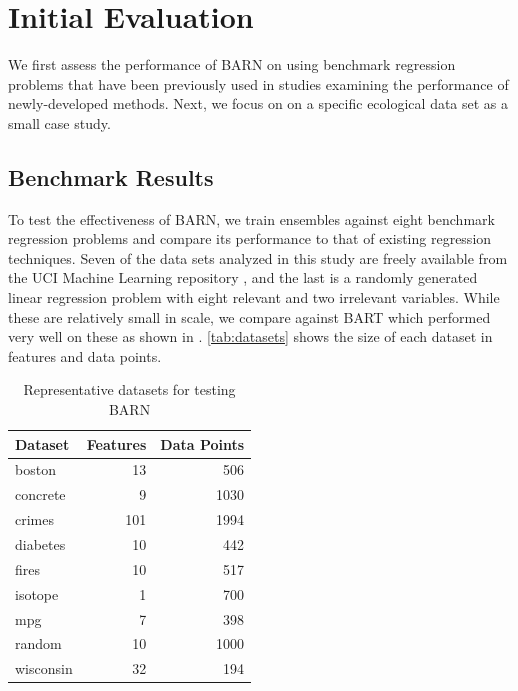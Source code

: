 \documentclass[12pt]{article}
\begin{document}
\section{Initial Evaluation}\label{sec:eval}

We first assess the performance of BARN on using benchmark regression problems that have been previously used in studies examining the performance of newly-developed methods. Next, we focus on on a specific ecological data set as a small case study.

\subsection{Benchmark Results}\label{subsec:res}

To test the effectiveness of BARN, we train ensembles against eight benchmark regression problems and compare its performance to that of existing regression techniques.  Seven of the data sets analyzed in this study are freely available from the UCI Machine Learning repository \cite{Dua:2019}, and the last is a randomly generated linear regression problem with eight relevant and two irrelevant variables.  While these are relatively small in scale, we compare against BART which performed very well on these as shown in \cite{biau2019neural}.  \autoref{tab:datasets} shows the size of each dataset in features and data points.

\begin{table}[htb]
\centering
\caption{Representative datasets for testing BARN}
\begin{tabular}{lrr}
Dataset & Features & Data Points\\ \hline
boston & 13 & 506\\
concrete & 9 & 1030\\
crimes & 101 & 1994\\
diabetes & 10 & 442 \\
fires & 10 & 517\\
isotope & 1 & 700 \\
mpg & 7 & 398\\
random & 10 & 1000 \\
wisconsin & 32 & 194\\
\end{tabular}
    \label{tab:datasets}
\end{table}
\end{document}
